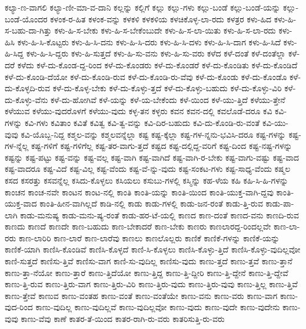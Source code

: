 {ಕಲ್ಯಾ-ಣ-ವಾಗಲಿ
ಕಲ್ಯಾ-ಣೀ-ಮಾ-ವ-ದಾನಿ
ಕಲ್ಲನ್ನು
ಕಲ್ಲಿಗೆ
ಕಲ್ಲು
ಕಲ್ಲು-ಗಳು
ಕಲ್ಲು-ಬಂಡೆ
ಕಲ್ಲು-ಬಂಡೆ-ಯನ್ನು
ಕಲ್ಲು-ಬಂಡೆ-ಯೊಂದರ
ಕಳಂಕ-ರ-ಹಿತ
ಕಳಂಕ-ವನ್ನು
ಕಳಕಳಿ
ಕಳಕಳಿಯ
ಕಳಚಿಕೊಳ್ಳ-ಲಾ-ರದು
ಕಳತ್ರರ
ಕಳು-ಹಿದ
ಕಳು-ಹಿ-ಸ-ಬಹು-ದಾ-ಗಿತ್ತು
ಕಳು-ಹಿ-ಸ-ಬೇಕು
ಕಳು-ಹಿ-ಸ-ಬೇಕೆಂಬುದೇ
ಕಳು-ಹಿ-ಸ-ಲಾ-ಯಿತು
ಕಳು-ಹಿ-ಸ-ಲಾ-ರದು
ಕಳು-ಹಿಸಿ
ಕಳು-ಹಿ-ಸಿ-ಕೊಟ್ಟರು
ಕಳು-ಹಿ-ಸಿ-ದನು
ಕಳು-ಹಿ-ಸಿ-ದರು
ಕಳು-ಹಿ-ಸಿ-ದಳು
ಕಳು-ಹಿ-ಸಿ-ದಾಗ
ಕಳು-ಹಿ-ಸಿದೆ
ಕಳು-ಹಿ-ಸಿದ್ದ
ಕಳು-ಹಿ-ಸಿ-ದ್ದರು
ಕಳು-ಹಿ-ಸುತ್ತದೆ
ಕಳು-ಹಿ-ಸು-ವನು
ಕಳು-ಹಿ-ಸು-ವರು
ಕಳೆದ
ಕಳೆ-ದಂತೆ
ಕಳೆ-ದಂತೆಲ್ಲಾ
ಕಳೆ-ದರೆ
ಕಳೆದು
ಕಳೆ-ದು-ಕೊಂಡ-ದ್ದ-ರಿಂದ
ಕಳೆ-ದು-ಕೊಂಡರು
ಕಳೆ-ದು-ಕೊಂಡರೆ
ಕಳೆ-ದು-ಕೊಂಡಿತು
ಕಳೆ-ದು-ಕೊಂಡಿದೆ
ಕಳೆ-ದು-ಕೊಂಡಿ-ದೆಯೋ
ಕಳೆ-ದು-ಕೊಂಡಿ-ರುವ
ಕಳೆ-ದು-ಕೊಂಡಿ-ರು-ವೆವು
ಕಳೆ-ದು-ಕೊಂಡು
ಕಳೆ-ದು-ಕೊಂಡೊ
ಕಳೆ-ದು-ಕೊಳ್ಳದಿ-ರುವ
ಕಳೆ-ದು-ಕೊಳ್ಳ-ಬೇಕು
ಕಳೆ-ದು-ಕೊಳ್ಳು-ತ್ತದೆ
ಕಳೆ-ದು-ಕೊಳ್ಳು-ಬಹುದು
ಕಳೆ-ದು-ಕೊಳ್ಳು-ವಿರಿ
ಕಳೆ-ದು-ಕೊಳ್ಳು-ವೆನು
ಕಳೆ-ದು-ಹೋಗಿವೆ
ಕಳೆ-ಯನ್ನು
ಕಳೆ-ಯ-ಬೇಕೆಂದು
ಕಳೆ-ಯಿಂದ
ಕಳೆ-ಯು-ತ್ತಿದೆ
ಕಳೆಯು-ತ್ತೇನೆ
ಕಳೆಯುವ
ಕಳೆಯು-ವುದರೊಳಗೆ
ಕಳೆಯು-ವುದು
ಕಳ್ಳ-ತನ
ಕಳ್ಳರು
ಕವನ
ಕವನ-ದಲ್ಲಿ
ಕವಲೊಡೆ-ದರೂ
ಕವಿ
ಕವಿ-ಗಳನ್ನು
ಕವಿ-ಗಳು
ಕವಿತಾಂ
ಕವಿತೆ
ಕವಿತ್ವ
ಕವಿ-ತ್ವ-ವನ್ನು
ಕವಿ-ದಿರ-ಬಹುದು
ಕವಿ-ದು-ಕೊಂಡಿ-ರು-ವಂತೆ
ಕವಿ-ಯು-ವುವು
ಕವಿ-ಯೊಬ್ಬ-ನಿದ್ದ
ಕಶ್ಮಲ-ವನ್ನು
ಕಶ್ಮಲವನ್ನೆಲ್ಲಾ
ಕಷ್ಟ
ಕಷ್ಟ-ಕ್ಕೆಲ್ಲಾ
ಕಷ್ಟ-ಗಳ-ನ್ನನು-ಭವಿಸಿ-ದರೂ
ಕಷ್ಟ-ಗಳನ್ನು
ಕಷ್ಟ-ಗಳ-ನ್ನೆಲ್ಲ
ಕಷ್ಟ-ಗಳಿಗೆ
ಕಷ್ಟ-ಗಳಿಗೆಲ್ಲ
ಕಷ್ಟ-ತರ-ವಾಗು-ತ್ತದೆ
ಕಷ್ಟದ
ಕಷ್ಟ-ದಲ್ಲಿದ್ದ-ವರಿಗೆ
ಕಷ್ಟ-ದಿಂದ
ಕಷ್ಟ-ನಷ್ಟ-ಗಳನ್ನು
ಕಷ್ಟನ್ನು
ಕಷ್ಟ-ಪಟ್ಟು
ಕಷ್ಟ-ವನ್ನು
ಕಷ್ಟ-ವಲ್ಲ
ಕಷ್ಟ-ವಾಗಿ
ಕಷ್ಟ-ವಾಗಿದೆ
ಕಷ್ಟ-ವಾಗಿ-ರ-ಬೇಕು
ಕಷ್ಟ-ವಾಗು-ವಷ್ಟು
ಕಷ್ಟ-ವಾದ
ಕಷ್ಟ-ವಾದರೂ
ಕಷ್ಟ-ವಿದೆ
ಕಷ್ಟ-ವಿಲ್ಲ
ಕಷ್ಟ-ವೆಂದು
ಕಷ್ಟ-ವೆ-ನ್ನು-ವುದು
ಕಷ್ಟ-ಸಂಕಟ-ಗಳು
ಕಷ್ಟ-ಸಾಧ್ಯ-ವೆಂದು
ಕಷ್ಮಲ
ಕಸದ
ಕಸರತ್ತು
ಕಸವನ್ನೆಲ್ಲ
ಕಸಿದು-ಕೊಳ್ಳಲು
ಕಸಿಯಲು
ಕಸುಬು-ಗಳಲ್ಲಿ
ಕಸ್ಮಿನ್ನು
ಕಹ-ಳೆಯ
ಕಹಿ
ಕಹಿ-ಸಿ-ಹಿ-ಗಳನ್ನು
ಕಾಂಚನ
ಕಾಂಚ-ನವೇ
ಕಾಂಟನ
ಕಾಂಟ-ನಲ್ಲಿ
ಕಾಂತಿ
ಕಾಂತಿ-ಯನ್ನು
ಕಾಂತಿ-ಯಿಂದ
ಕಾಂತಿ-ಯುಕ್ತ-ವಾಗಿ-ದ್ದವು
ಕಾಂತಿ-ಯುಕ್ತ-ವಾದ
ಕಾಂತಿ-ಹೀನ-ವಾಗಿಲ್ಲದೆ
ಕಾಡಿ-ನಲ್ಲಿ
ಕಾಡು
ಕಾಡು-ಗಳಲ್ಲಿ
ಕಾಡು-ಜನ-ರಂತೆ
ಕಾಡು-ತ್ತಿ-ರುವ
ಕಾಡು-ಪಾ-ಲಾಗಿ
ಕಾಡು-ಮನುಷ್ಯ
ಕಾಡು-ಮನು-ಷ್ಯ-ರಂತೆ
ಕಾಡು-ಹರ-ಟೆ-ಯಲ್ಲಿ
ಕಾಣದ
ಕಾಣ-ದಂತೆ
ಕಾಣದ-ವನು
ಕಾಣದಿ-ರುವ
ಕಾಣದು
ಕಾಣದೆ
ಕಾಣದೇ
ಕಾಣ-ಬಹುದು
ಕಾಣ-ಬೇಕಾದರೆ
ಕಾಣ-ಬೇಕು
ಕಾಣರು
ಕಾಣಲಾರದ್ದ-ರಿಂದಲ್ಲವೇ
ಕಾಣ-ಲಾ-ರರು
ಕಾಣ-ಲಾರಿರಿ
ಕಾಣ-ಲಾರೆ
ಕಾಣ-ಲಾರೆವು
ಕಾಣಲು
ಕಾಣಲೊಲ್ಲರು
ಕಾಣಿಕೆ
ಕಾಣಿಕೆ-ಗಳನ್ನು
ಕಾಣಿಕೆ-ಯನ್ನು
ಕಾಣಿಕೆ-ಯಾಗಿ
ಕಾಣಿಸಿ-ಕೊಂಡಿವೆ
ಕಾಣಿಸಿ-ಕೊಳ್ಳದೆ
ಕಾಣಿ-ಸಿ-ಕೊಳ್ಳಲು
ಕಾಣಿಸಿ-ಕೊಳ್ಳು-ತ್ತಿದೆ
ಕಾಣಿಸಿ-ಕೊಳ್ಳು-ವುದಿಲ್ಲವೋ
ಕಾಣಿ-ಸುತ್ತದೆ
ಕಾಣಿಸು-ತ್ತಿವೆ
ಕಾಣಿಸು-ವಾಗ
ಕಾಣಿ-ಸು-ವುದಿಲ್ಲ
ಕಾಣಿಸು-ವುದು
ಕಾಣು-ತ್ತದೆ
ಕಾಣು-ತ್ತವೆ
ಕಾಣು-ತ್ತಾನೆ
ಕಾಣು-ತ್ತಾ-ನೆಯೋ
ಕಾಣು-ತ್ತಾರೆ
ಕಾಣು-ತ್ತಿದೆಯೋ
ಕಾಣು-ತ್ತಿದ್ದ
ಕಾಣು-ತ್ತಿ-ದ್ದೀರಿ
ಕಾಣು-ತ್ತಿ-ದ್ದೇನೆ
ಕಾಣು-ತ್ತಿ-ದ್ದೇವೆ
ಕಾಣು-ತ್ತಿ-ರುವ
ಕಾಣು-ತ್ತಿರು-ವಾಗ
ಕಾಣು-ತ್ತಿರು-ವಿರಿ
ಕಾಣು-ತ್ತಿರು-ವುದು
ಕಾಣು-ತ್ತಿರು-ವುವು
ಕಾಣು-ತ್ತಿಲ್ಲ
ಕಾಣು-ತ್ತಿವೆ
ಕಾಣು-ತ್ತೇವೆ
ಕಾಣುವ
ಕಾಣು-ವಂತಹ
ಕಾಣು-ವಂತೆ
ಕಾಣು-ವಂತೆಯೇ
ಕಾಣು-ವನು
ಕಾಣು-ವರು
ಕಾಣು-ವಾಗ
ಕಾಣು-ವುದ-ರಿಂದ
ಕಾಣು-ವುದಿಲ್ಲ
ಕಾಣು-ವುದಿಲ್ಲವೆ
ಕಾಣು-ವುದಿಲ್ಲವೋ
ಕಾಣು-ವುದು
ಕಾಣು-ವುದೇ
ಕಾಣು-ವುದೇನು
ಕಾಣು-ವುವು
ಕಾಣು-ವೆವು
ಕಾಣೆ
ಕಾತರ-ತೆ-ಯಿಂದ
ಕಾತರ-ರಾಗಿ-ರು-ವರು
ಕಾತರಿಸುತ್ತಿ-ರು-ವರು
}
